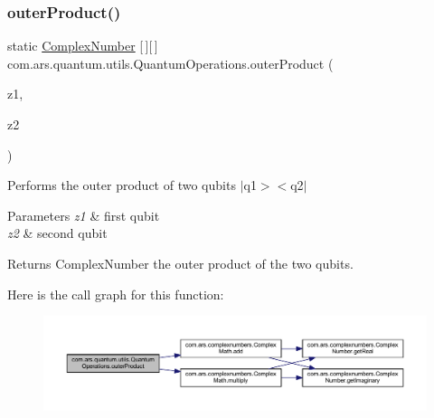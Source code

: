 \subsubsection{\texorpdfstring{outer\+Product()}{outerProduct()}\hspace{0.1cm}{\footnotesize\ttfamily [2/2]}}
{\footnotesize\ttfamily static \hyperlink{classcom_1_1ars_1_1complexnumbers_1_1_complex_number}{Complex\+Number} \mbox{[}$\,$\mbox{]}\mbox{[}$\,$\mbox{]} com.\+ars.\+quantum.\+utils.\+Quantum\+Operations.\+outer\+Product (\begin{DoxyParamCaption}\item[{\hyperlink{classcom_1_1ars_1_1complexnumbers_1_1_complex_number}{Complex\+Number} \mbox{[}$\,$\mbox{]}}]{z1,  }\item[{\hyperlink{classcom_1_1ars_1_1complexnumbers_1_1_complex_number}{Complex\+Number} \mbox{[}$\,$\mbox{]}}]{z2 }\end{DoxyParamCaption})\hspace{0.3cm}{\ttfamily [static]}}

Performs the outer product of two qubits $\vert$q1$>$$<$q2$\vert$


\begin{DoxyParams}{Parameters}
{\em z1} & first qubit \\
\hline
{\em z2} & second qubit \\
\hline
\end{DoxyParams}
\begin{DoxyReturn}{Returns}
Complex\+Number the outer product of the two qubits. 
\end{DoxyReturn}
Here is the call graph for this function\+:
\nopagebreak
\begin{figure}[H]
\begin{center}
\leavevmode
\includegraphics[width=350pt]{classcom_1_1ars_1_1quantum_1_1utils_1_1_quantum_operations_a6d799274602f9c86fe28930b67ff5853_cgraph}
\end{center}
\end{figure}
\hypertarget{classcom_1_1ars_1_1quantum_1_1utils_1_1_quantum_operations_aa93536fa306fcff162cc9cbde2f89356}{}\label{classcom_1_1ars_1_1quantum_1_1utils_1_1_quantum_operations_aa93536fa306fcff162cc9cbde2f89356} 

